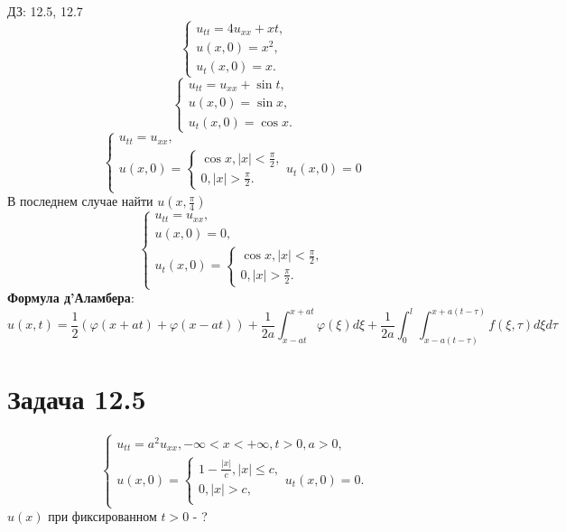 \documentclass[11pt]{article}
\author{Sergey Makarov}
\date{\today}
\title{}
\def\zall{\setcounter{lem}{0}\setcounter{cnsqnc}{0}\setcounter{th}{0}\setcounter{Cmt}{0}\setcounter{equation}{0}}
\newcounter{lem}\setcounter{lem}{0}
\newcounter{th}\setcounter{th}{0}
\newcounter{cnsqnc}\setcounter{cnsqnc}{0}
\newcounter{Cmt}\setcounter{Cmt}{0}
\begin{document}
\zall

ДЗ: 12.5, 12.7
\begin{equation}
\begin{cases}
u_{tt} = 4u_{xx} + xt, \\
u(x, 0) = x^2, \\
u_t(x, 0) = x.
\end{cases}
\end{equation}
\begin{equation}
\begin{cases}
u_{tt} = u_{xx} + \sin t, \\
u(x, 0) = \sin x, \\
u_t(x, 0) = \cos x.
\end{cases}
\end{equation}
\begin{equation}
\begin{cases}
u_{tt} = u_{xx}, \\
u(x, 0) = \begin{cases}
\cos x, |x| < \frac{\pi}2, \\
0, |x| > \frac{\pi}2.
\end{cases}
u_t(x, 0) = 0
\end{cases}
\end{equation}
В последнем случае найти $u\left(x, \frac{\pi}4\right)$
\begin{equation}
\begin{cases}
u_{tt} = u_{xx}, \\
u(x, 0) = 0, \\
u_t(x, 0) = \begin{cases}
\cos x, |x| < \frac{\pi}2, \\
0, |x| > \frac{\pi}2.
\end{cases}
\end{cases}
\end{equation}
\textbf{Формула д'Аламбера}:
\begin{equation}
u(x, t) = \frac12(\varphi(x + at) + \varphi(x - at)) +
\frac1{2a}\int_{x - at}^{x + at}\varphi(\xi)d\xi +
\frac1{2a}\int_0^l\int_{x - a(t - \tau)}^{x + a(t - \tau)}f(\xi, \tau)d\xi d\tau
\end{equation}
\section{Задача 12.5}
\label{sec:org2e65491}
\begin{equation}
\begin{cases}
u_{tt} = a^2u_{xx}, -\infty < x < +\infty, t > 0, a > 0, \\
u(x, 0) = \begin{cases}
1 - \frac{|x|}c, |x| \leq c, \\
0, |x| > c, \\
\end{cases}
u_t(x, 0) = 0.
\end{cases}
\end{equation}
$u(x)$ при фиксированном $t > 0$ - ?
\end{document}
